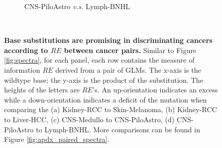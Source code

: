 \begin{figure}[ht!]
\begin{subfigure}{.5\textwidth}
    \caption{CNS-PiloAstro \textit{v.s.} Lymph-BNHL}
    \label{fig:spectra_piloastro_bnhl}
    \end{subfigure} \\
    \vspace{0.5cm}
    \caption{\textbf{Base substitutions are promising in discriminating cancers according to $RE$ between cancer pairs.} Similar to Figure \ref{fig:spectra}, for each panel, each row contains the measure of information $RE$ derived from a pair of GLMs. The x-axis is the wildtype base; the y-axis is the product of the substitution. The heights of the letters are $RE$'s. An up-orientation indicates an excess while a down-orientation indicates a deficit of the mutation when comparing the (a) Kidney-RCC to Skin-Melanoma, (b) Kidney-RCC to Liver-HCC, (c) CNS-Medullo to CNS-PiloAstro, (d) CNS-PiloAstro to Lymph-BNHL. More comparisons can be found in Figure \ref{fig:apdx_paired_spectra}.}
    \label{fig:paired_spectra}
\end{figure}
